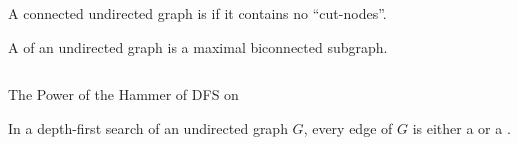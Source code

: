 
\begin{frame}{}
  \begin{definition}
    A connected undirected graph is  if it contains no ``cut-nodes''.
  \end{definition}

  \pause
  \vspace{0.80cm}
  \begin{definition}
    A  of an undirected graph is a maximal biconnected subgraph.
  \end{definition}
\end{frame}

\begin{frame}{}
  \begin{columns}
      \pause
  \end{columns}

  \pause
  \vspace{0.30cm}
  \centerline{ }
\end{frame}

\begin{frame}{}
  \begin{center}
    {\large The Power of the Hammer of DFS on }
  \end{center}


  \pause
  \begin{theorem}[Theorem $22.10$]
    In a depth-first search of an undirected graph $G$, 
    every edge of $G$ is either a  or a .
  \end{theorem}
\end{frame}

\begin{frame}{}

  \pause
  \begin{center}
  \end{center}
\end{frame}


